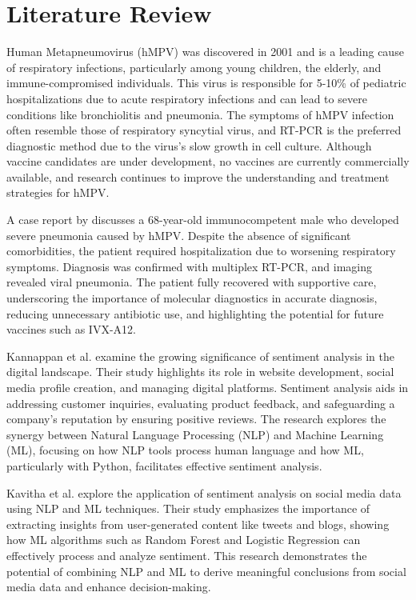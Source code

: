 \section{Literature Review}
Human Metapneumovirus (hMPV) was discovered in 2001 and is a leading cause of respiratory infections, particularly among young children, the elderly, and immune-compromised individuals\cite{PANDA201445}. This virus is responsible for 5-10\% of pediatric hospitalizations due to acute respiratory infections and can lead to severe conditions like bronchiolitis and pneumonia. The symptoms of hMPV infection often resemble those of respiratory syncytial virus, and RT-PCR is the preferred diagnostic method due to the virus's slow growth in cell culture. Although vaccine candidates are under development, no vaccines are currently commercially available, and research continues to improve the understanding and treatment strategies for hMPV.

A case report by \cite{microorganisms13010073} discusses a 68-year-old immunocompetent male who developed severe pneumonia caused by hMPV. Despite the absence of significant comorbidities, the patient required hospitalization due to worsening respiratory symptoms. Diagnosis was confirmed with multiplex RT-PCR, and imaging revealed viral pneumonia. The patient fully recovered with supportive care, underscoring the importance of molecular diagnostics in accurate diagnosis, reducing unnecessary antibiotic use, and highlighting the potential for future vaccines such as IVX-A12.

Kannappan et al.\cite{article12} examine the growing significance of sentiment analysis in the digital landscape. Their study highlights its role in website development, social media profile creation, and managing digital platforms. Sentiment analysis aids in addressing customer inquiries, evaluating product feedback, and safeguarding a company's reputation by ensuring positive reviews. The research explores the synergy between Natural Language Processing (NLP) and Machine Learning (ML), focusing on how NLP tools process human language and how ML, particularly with Python, facilitates effective sentiment analysis.

Kavitha et al.\cite{9823708} explore the application of sentiment analysis on social media data using NLP and ML techniques. Their study emphasizes the importance of extracting insights from user-generated content like tweets and blogs, showing how ML algorithms such as Random Forest and Logistic Regression can effectively process and analyze sentiment. This research demonstrates the potential of combining NLP and ML to derive meaningful conclusions from social media data and enhance decision-making.

